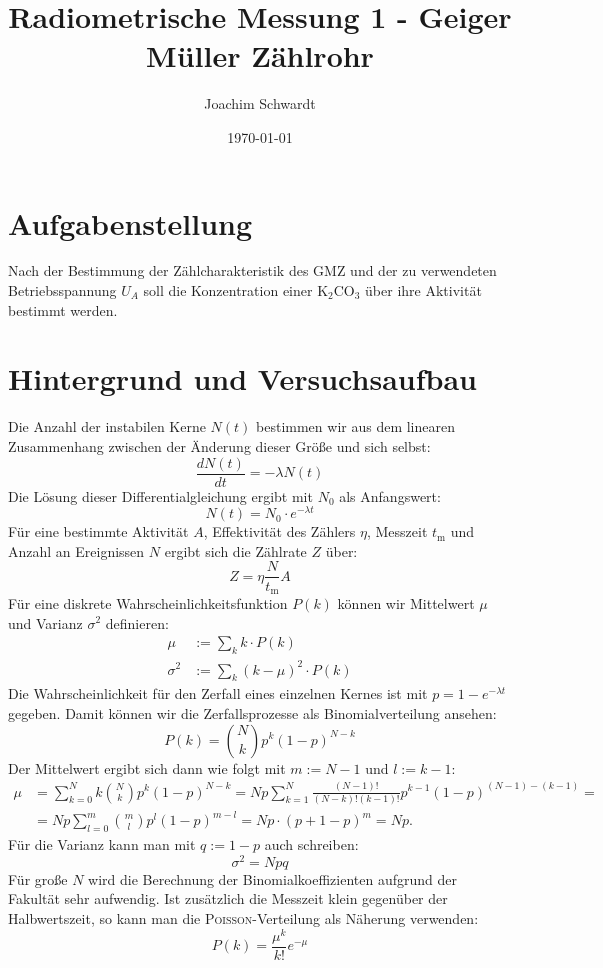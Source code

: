 \documentclass[a4paper,12pt]{article}
\begin{document}
\title{Radiometrische Messung 1 - Geiger Müller Zählrohr}
\author{Joachim Schwardt}
\date{\today}
\maketitle

\section{Aufgabenstellung}
Nach der Bestimmung der Zählcharakteristik des GMZ und der zu verwendeten Betriebsspannung $U_A$ soll die Konzentration einer K$_2$CO$_3$ über ihre Aktivität bestimmt werden. 
\section{Hintergrund und Versuchsaufbau}
Die Anzahl der instabilen Kerne $N(t)$ bestimmen wir aus dem linearen Zusammenhang zwischen der Änderung dieser Größe und sich selbst:
$$\frac{dN(t)}{dt}=-\lambda N(t)$$
Die Lösung dieser Differentialgleichung ergibt mit $N_0$ als Anfangswert:
$$N(t)=N_0\cdot e^{-\lambda t}$$
Für eine bestimmte Aktivität $A$, Effektivität des Zählers $\eta$, Messzeit $t_\mathrm{m}$ und Anzahl an Ereignissen $N$ ergibt sich die Zählrate $Z$ über:
$$Z = \eta\frac{N}{t_\mathrm{m}}A$$
Für eine diskrete Wahrscheinlichkeitsfunktion $P(k)$ können wir Mittelwert $\mu$ und Varianz $\sigma^2$ definieren:
\begin{align*}
\mu&:=\sum_kk\cdot P(k)\\
\sigma^2&:=\sum_k (k-\mu)^2\cdot P(k)
\end{align*}
Die Wahrscheinlichkeit für den Zerfall eines einzelnen Kernes ist mit $p=1-e^{-\lambda t}$ gegeben. Damit können wir die Zerfallsprozesse als Binomialverteilung ansehen:
$$P(k) = \binom Nk p^k(1-p)^{N-k}$$
Der Mittelwert ergibt sich dann wie folgt mit $m:=N-1$ und $l:=k-1$:
\begin{align*}
  \mu &= \sum_{k=0}^N k\binom Nk p^k (1-p)^{N-k}= Np\sum_{k=1}^N \frac{(N-1)!}{(N-k)!(k-1)!}p^{k-1} (1-p)^{(N-1)-(k-1)}=\\ 
  &= Np\sum_{l=0}^m \binom ml p^l (1-p)^{m-l}= Np\cdot (p+1-p)^m=Np.
\end{align*} 
Für die Varianz kann man mit $q:=1-p$ auch schreiben:
$$\sigma^2=Npq$$
Für große $N$ wird die Berechnung der Binomialkoeffizienten aufgrund der Fakultät sehr aufwendig. Ist zusätzlich die Messzeit klein gegenüber der Halbwertszeit, so kann man die \textsc{Poisson}-Verteilung als Näherung verwenden:
$$P(k)=\frac{\mu^k}{k!}e^{-\mu}$$
\end{document}
